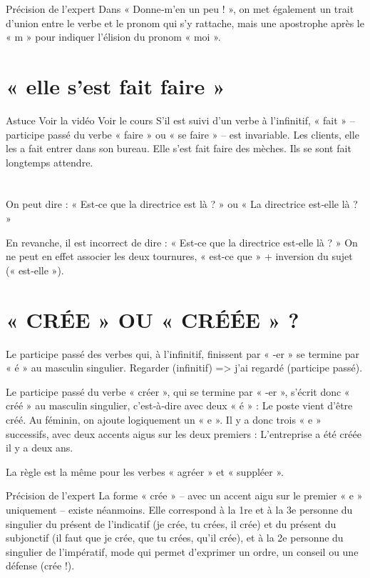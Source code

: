 Précision de l'expert
Dans « Donne‑m'en un peu ! », on met également un trait d'union entre le verbe et le pronom qui s'y rattache, mais une apostrophe après le « m » pour indiquer l'élision du pronom « moi ».

\section{« elle s'est fait faire »}

Astuce Voir la vidéo Voir le cours
S'il est suivi d'un verbe à l'infinitif, « fait » – participe passé du verbe « faire » ou « se faire » – est invariable.
Les clients, elle les a fait entrer dans son bureau.
Elle s'est fait faire des mèches.
Ils se sont fait longtemps attendre.


\section{}
On peut dire : « Est‑ce que la directrice est là ? » ou « La directrice est‑elle là ? »

En revanche, il est incorrect de dire : « Est‑ce que la directrice est‑elle là ? » On ne peut en effet associer les deux tournures, « est‑ce que » + inversion du sujet (« est‑elle »).

\section{« CRÉE » OU « CRÉÉE » ?}

Le participe passé des verbes qui, à l'infinitif, finissent par « ‑er » se termine par « é » au masculin singulier.
Regarder (infinitif) => j'ai regardé (participe passé).

Le participe passé du verbe « créer », qui se termine par « ‑er », s'écrit donc « créé » au masculin singulier, c'est‑à‑dire avec deux « é » : Le poste vient d'être créé.
Au féminin, on ajoute logiquement un « e ». Il y a donc trois « e » successifs, avec deux accents aigus sur les deux premiers : L'entreprise a été créée il y a deux ans.

La règle est la même pour les verbes « agréer » et « suppléer ».

Précision de l'expert
La forme « crée » – avec un accent aigu sur le premier « e » uniquement – existe néanmoins. Elle correspond à la 1re et à la 3e personne du singulier du présent de l'indicatif (je crée, tu crées, il crée) et du présent du subjonctif (il faut que je crée, que tu crées, qu'il crée), et à la 2e personne du singulier de l'impératif, mode qui permet d'exprimer un ordre, un conseil ou une défense (crée !).

